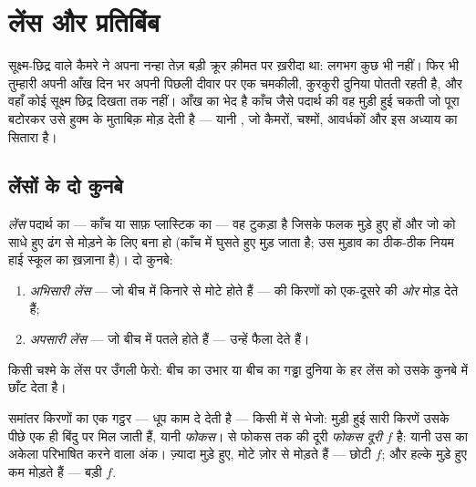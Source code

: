 \chapter{लेंस और प्रतिबिंब}\label{ch:g8:lenses-images}

सूक्ष्म-छिद्र वाले कैमरे ने अपना नन्हा तेज़  बड़ी क्रूर क़ीमत
पर ख़रीदा था: लगभग कुछ भी  नहीं। फिर भी तुम्हारी अपनी आँख दिन भर
अपनी पिछली दीवार पर एक चमकीली, कुरकुरी दुनिया पोतती रहती है, और वहाँ
कोई सूक्ष्म छिद्र दिखता तक नहीं। आँख का भेद है काँच जैसे पदार्थ की वह
मुड़ी हुई चकती जो पूरा  बटोरकर उसे हुक्म के मुताबिक़ मोड़ देती
है --- यानी , जो कैमरों, चश्मों, आवर्धकों और इस अध्याय का सितारा
है।

\section{लेंसों के दो कुनबे}

\begin{definition}[अभिसारी और अपसारी लेंस]\label{def:g8:lenses-images:families}
\emph{लेंस}  पदार्थ का --- काँच या साफ़ प्लास्टिक
का --- वह टुकड़ा है जिसके फलक मुड़े हुए हों और जो  को साधे हुए
ढंग से मोड़ने के लिए बना हो (काँच में घुसते हुए  मुड़ जाता है;
उस मुड़ाव का ठीक-ठीक नियम हाई स्कूल का ख़ज़ाना है)। दो कुनबे:
\begin{enumerate}
  \item \emph{अभिसारी लेंस} --- जो बीच में
        किनारे से मोटे होते हैं ---  की किरणों को एक-दूसरे की
        \emph{ओर} मोड़ देते हैं;
  \item \emph{अपसारी लेंस} --- जो बीच में पतले
        होते हैं --- उन्हें फैला देते हैं।
\end{enumerate}
किसी चश्मे के लेंस पर उँगली फेरो: बीच का उभार या बीच का गड्ढा दुनिया
के हर लेंस को उसके कुनबे में छाँट देता है।
\end{definition}

\begin{definition}[फोकस और फोकस दूरी]\label{def:g8:lenses-images:focus}
समांतर किरणों का एक गट्ठर --- धूप काम दे देती है --- किसी 
में से भेजो: मुड़ी हुई सारी किरणें उसके पीछे एक ही बिंदु पर मिल जाती
हैं, यानी \emph{फोकस}।  से फोकस तक की दूरी \emph{फोकस
दूरी} $f$ है: यानी उस  का अकेला परिभाषित करने
वाला अंक। ज़्यादा मुड़े हुए, मोटे  ज़ोर से मोड़ते हैं --- छोटी
$f$; और हल्के मुड़े हुए  कम मोड़ते हैं --- बड़ी $f$.
\end{definition}

